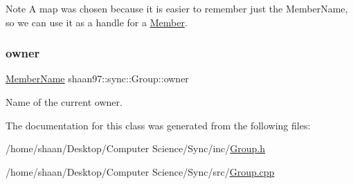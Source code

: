 \begin{DoxyNote}{Note}
A map was chosen because it is easier to remember just the Member\+Name, so we can use it as a handle for a \hyperlink{classshaan97_1_1sync_1_1_member}{Member}. 
\end{DoxyNote}
\mbox{\label{classshaan97_1_1sync_1_1_group_a730370c59bdfa2bf793c677825e29acf}} 
\subsubsection{\texorpdfstring{owner}{owner}}
{\footnotesize\ttfamily \hyperlink{namespaceshaan97_1_1sync_af59c2c9185f7cde547b79fbe0bf8ec71}{Member\+Name} shaan97\+::sync\+::\+Group\+::owner\hspace{0.3cm}{\ttfamily [private]}}



Name of the current owner. 



The documentation for this class was generated from the following files\+:\begin{DoxyCompactItemize}
\item 
/home/shaan/\+Desktop/\+Computer Science/\+Sync/inc/\hyperlink{_group_8h}{Group.\+h}\item 
/home/shaan/\+Desktop/\+Computer Science/\+Sync/src/\hyperlink{_group_8cpp}{Group.\+cpp}\end{DoxyCompactItemize}
